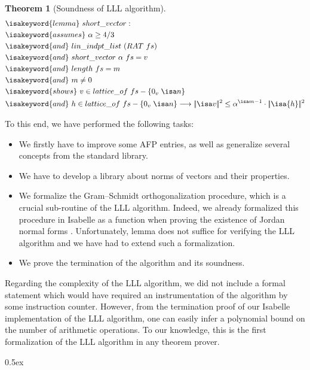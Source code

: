 \documentclass[11pt,a4paper]{article}
\newcommand\norm[1]{|\!|#1|\!|}
\newcommand\sqnorm[1]{\norm{#1}^2}
\newcommand\lemma{\isakeyword{lemma}\xspace}
\newcommand\assumes{\isakeyword{assumes}\xspace}
\newcommand\iand{\isakeyword{and}\xspace}
\newcommand\shows{\isakeyword{shows}}
\newtheorem{theorem}{Theorem}
\begin{document}
\begin{theorem}[Soundness of LLL algorithm]
\label{thm:LLL}
\begin{align*}
&\lemma\ short\_vector:\\
&\assumes\ \alpha \geq 4 / 3\\
&\iand\ lin\_indpt\_list\ (RAT\ fs)\\
&\iand\ short\_vector\ \alpha\ fs = v\\
&\iand\ length\ fs = m\\
&\iand\ m \neq 0\\
&\shows\ v \in lattice\_of\ fs - \{0_v\;\isa n\}\\
&\iand\ h \in lattice\_of\ fs - \{0_v\;\isa n\} \longrightarrow \sqnorm{\isa v} \leq \alpha^{\isa m-1} \cdot \sqnorm{\isa{h}}
\end{align*}
\end{theorem}

To this end, we have performed the following tasks:
\begin{itemize}
 \item We firstly have to improve some AFP entries, as well as generalize several concepts from the standard library.
 \item We have to develop a library about norms of vectors and their properties.
 \item We formalize the Gram--Schmidt orthogonalization 
      procedure, which is a crucial sub-routine of the LLL algorithm. 
      Indeed, we already formalized this procedure in Isabelle as a function  when proving
      the existence of Jordan normal forms \cite{ThiemannY16}. 
      Unfortunately, lemma  does not suffice for verifying the LLL algorithm and we have had to extend such a formalization. 
  \item We prove the termination of the algorithm and its soundness.
\end{itemize}

Regarding the complexity of the LLL algorithm, we did not include a formal statement
which would have required an instrumentation of the algorithm by some instruction counter.
However, from the termination proof of our Isabelle implementation 
of the LLL algorithm,
one can easily infer a polynomial bound on the number of arithmetic operations. 
To our knowledge, this is the first formalization of the LLL algorithm in any theorem prover.


\parindent 0pt\parskip 0.5ex





\end{document}
